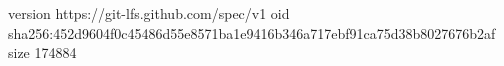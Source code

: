 version https://git-lfs.github.com/spec/v1
oid sha256:452d9604f0c45486d55e8571ba1e9416b346a717ebf91ca75d38b8027676b2af
size 174884
